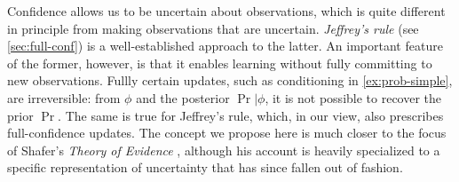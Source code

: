 Confidence allows us to be uncertain about observations,
which is quite different in principle from making observations that are uncertain.
\emph{Jeffrey's rule} \parencite{Jeffrey68} (see \cref{sec:full-conf}) is a well-established approach to the latter.
An important feature of the former, however, is that it enables
learning without fully committing to new observations.
Fullly certain updates, such as conditioning in \cref{ex:prob-simple}, are irreversible: 
from $\phi$ and the posterior $\Pr|\phi$, it is not possible to recover the prior $\Pr$.
The same is true for Jeffrey's rule,
which, in our view, also prescribes full-confidence updates. 
%
The concept we propose here is much closer to 
the focus of Shafer's \emph{Theory of Evidence} \cite{shafer1976mathematical},
although his account is heavily specialized to a specific representation of uncertainty that has since fallen out of fashion.

